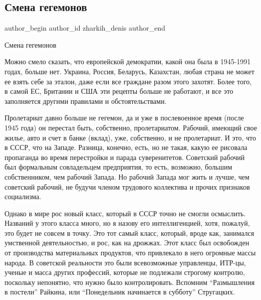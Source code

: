  
 
 
 
 
 
\subsection{Смена гегемонов}
\label{sec:09_01_2022.fb.zharkih_denis.1.smena_gegemonov}
 
\ifcmt
 author_begin
   author_id zharkih_denis
 author_end
\fi

Смена гегемонов

Можно смело сказать, что европейской демократии, какой она была в 1945-1991
годах, больше нет. Украина, Россия, Беларусь, Казахстан, любая страна не может
ее взять себе за эталон, даже если все граждане разом этого захотят. Более
того, в самой ЕС, Британии и США эти рецепты больше не работают, и все это
заполняется другими правилами и обстоятельствами. 

Пролетариат давно больше не гегемон, да и уже в послевоенное время (после 1945
года) он перестал быть, собственно, пролетариатом. Рабочий, имеющий свое жилье,
авто и счет в банке (вклад), уже, собственно, и не пролетариат. И это, что в
СССР, что на Западе. Разница, конечно, есть, но не такая, какую ее рисовала
пропаганда во время перестройки и парада суверенитетов. Советский рабочий был
формальным совладельцем предприятия, то есть, возможно, большим собственником,
чем рабочий Запада. Но рабочий Запада мог жить и лучше, чем советский рабочий,
не будучи членом трудового коллектива и прочих признаков социализма. 

Однако в мире рос новый класс, который в СССР точно не смогли осмыслить.
Названий у этого класса много, но я назову его интеллигенцией, хотя, пожалуй,
это будет не совсем в точку.  Это тот самый класс, который, вроде как,
занимался умственной деятельностью, и рос, как на дрожжах. Этот класс был
освобожден от производства материальных продуктов, что привлекало в него
огромные массы народа. В советской реальности это были всевозможные управленцы,
ИТР-цы, ученые и масса других профессий, которые не подлежали строгому
контролю, поскольку непонятно, что нужно было контролировать. Вспомним
\enquote{Размышления в постели} Райкина, или \enquote{Понедельник начинается в субботу}
Стругацких. 

